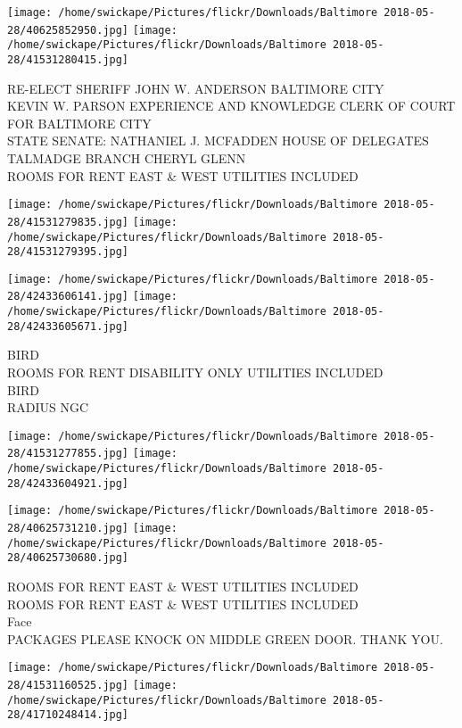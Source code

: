 \documentclass[10pt,letterpaper]{article}
\begin{document}
\texttt{[image: /home/swickape/Pictures/flickr/Downloads/Baltimore 2018-05-28/40625852950.jpg]}
\texttt{[image: /home/swickape/Pictures/flickr/Downloads/Baltimore 2018-05-28/41531280415.jpg]}

RE{-}ELECT SHERIFF JOHN W. ANDERSON BALTIMORE CITY\\
KEVIN W. PARSON EXPERIENCE AND KNOWLEDGE CLERK OF COURT FOR BALTIMORE CITY\\
STATE SENATE: NATHANIEL J. MCFADDEN HOUSE OF DELEGATES TALMADGE BRANCH CHERYL GLENN\\
ROOMS FOR RENT EAST \& WEST UTILITIES INCLUDED\\
\pagebreak

\texttt{[image: /home/swickape/Pictures/flickr/Downloads/Baltimore 2018-05-28/41531279835.jpg]}
\texttt{[image: /home/swickape/Pictures/flickr/Downloads/Baltimore 2018-05-28/41531279395.jpg]}

\texttt{[image: /home/swickape/Pictures/flickr/Downloads/Baltimore 2018-05-28/42433606141.jpg]}
\texttt{[image: /home/swickape/Pictures/flickr/Downloads/Baltimore 2018-05-28/42433605671.jpg]}

BIRD\\
ROOMS FOR RENT DISABILITY ONLY UTILITIES INCLUDED\\
BIRD\\
RADIUS NGC\\
\pagebreak

\texttt{[image: /home/swickape/Pictures/flickr/Downloads/Baltimore 2018-05-28/41531277855.jpg]}
\texttt{[image: /home/swickape/Pictures/flickr/Downloads/Baltimore 2018-05-28/42433604921.jpg]}

\texttt{[image: /home/swickape/Pictures/flickr/Downloads/Baltimore 2018-05-28/40625731210.jpg]}
\texttt{[image: /home/swickape/Pictures/flickr/Downloads/Baltimore 2018-05-28/40625730680.jpg]}

ROOMS FOR RENT EAST \& WEST UTILITIES INCLUDED\\
ROOMS FOR RENT EAST \& WEST UTILITIES INCLUDED\\
Face\\
PACKAGES PLEASE KNOCK ON MIDDLE GREEN DOOR.  THANK YOU.\\
\pagebreak

\texttt{[image: /home/swickape/Pictures/flickr/Downloads/Baltimore 2018-05-28/41531160525.jpg]}
\texttt{[image: /home/swickape/Pictures/flickr/Downloads/Baltimore 2018-05-28/41710248414.jpg]}
\end{document}
